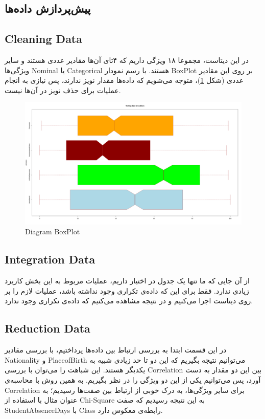 \documentclass{article}
\begin{document}
\begin{large}
        \newpage
        \section{پیش‌پردازش داده‌ها}
        \subsection{Cleaning Data}
        
        در این دیتاست، مجموعا ۱۸ ویژگی داریم که ۴تای آن‌ها مقادیر عددی هستند و سایر ویژگی‌ها Nominal یا Categorical هستند.
        با رسم نمودار BoxPlot بر روی این مقادیر عددی (شکل \ref{fig:boxplot})، متوجه می‌شویم که داده‌ها مقدار نویز ندارند، پس نیازی به انجام عملیات برای حذف نویز در آن‌ها نیست.

        \begin{figure}[h]
            \centering
            \includegraphics[width=1\textwidth]{images/boxplot.png}
            \caption{Diagram BoxPlot}
            \label{fig:boxplot}
        \end{figure}

        \subsection{Integration Data}
        از آن جایی که ما تنها یک جدول در اختیار داریم، عملیات مربوط به این بخش کاربرد زیادی ندارد. فقط برای این‌ که داده‌ی تکراری وجود نداشته باشد، عملیات لازم را بر روی دیتاست اجرا می‌کنیم
        و در نتیجه مشاهده می‌کنیم که داده‌ی تکراری وجود ندارد.

        \subsection{Reduction Data}
        در این قسمت ابتدا به بررسی ارتباط بین داده‌ها پرداختیم، با بررسی مقادیر Nationality و PlaceofBirth می‌توانیم نتیجه بگیریم که این دو تا حد زیادی شبیه به یکدیگر هستند.
        این شباهت را می‌توان با بررسی Correlation بین این دو مقدار به دست آورد،
        پس می‌توانیم یکی از این دو ویژگی را در نظر بگیریم.
        به همین روش با محاسبه‌ی Correlation برای سایر ویژگی‌ها، به درک خوبی از  ارتباط بین صفت‌ها رسیدیم؛ به عنوان مثال با استفاده از Chi-Square به این نتیجه رسیدیم که صفت StudentAbsenceDays با Class رابطه‌ی معکوس دارد.
        

\end{large}
\end{document}
